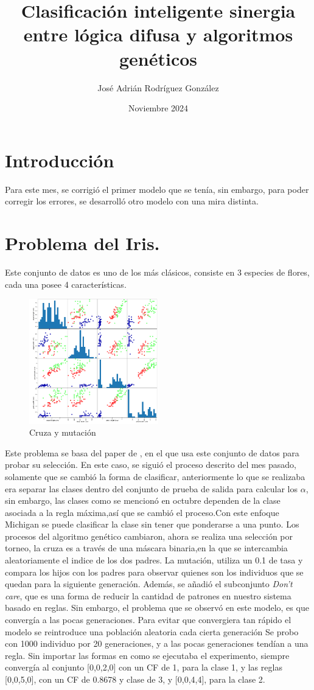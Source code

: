 \documentclass{article}
\title{Clasificación inteligente sinergia entre lógica difusa y algoritmos genéticos }
\author{José Adrián Rodríguez González}
\date{Noviembre 2024}
\begin{document}
\maketitle
\section{Introducción}
Para este mes, se corrigió el primer modelo que se tenía, sin embargo, para poder corregir los errores, se desarrolló otro modelo con una mira distinta.
\section{Problema del Iris.}
Este conjunto de datos es uno de los más clásicos, consiste en 3 especies de flores, cada una posee 4 características.
\begin{figure}[h]
    \centering
    \includegraphics[width=0.5\textwidth]{image.png}
    \caption{Cruza y mutación}
    \label{fig:fig1}
\end{figure}

Este problema se basa del paper de \citep{413232}, en el que usa este conjunto de datos para probar su selección. En este caso, se siguió el proceso descrito del mes pasado, solamente que se cambió la forma de clasificar, anteriormente lo que se realizaba era separar las clases dentro del conjunto de prueba de salida para calcular los \(\alpha\), sin embargo, las clases como se mencionó en octubre dependen de la clase asociada a la regla máxima,así que se cambió el proceso.Con este enfoque Michigan se puede clasificar la clase sin tener que ponderarse a una punto. Los procesos del algoritmo genético cambiaron, ahora se realiza una selección por torneo, la cruza es a través de una máscara binaria,en la que se intercambia aleatoriamente el indice de los dos padres.
La mutación, utiliza un 0.1 de tasa y compara los hijos con los padres para observar quienes son los individuos que se quedan para la siguiente generación. Además, se añadió el subconjunto \textit{Don't care}, que es una forma de reducir la cantidad de patrones en nuestro sistema basado en reglas.
Sin embargo, el problema que se observó en este modelo, es que convergía a las pocas generaciones.
Para evitar que convergiera tan rápido el modelo se reintroduce una población aleatoria cada cierta generación
Se probo con 1000 individuo por 20 generaciones, y a las pocas generaciones tendían a una regla. Sin importar las formas en como se ejecutaba el experimento, siempre convergía al conjunto [0,0,2,0] con un CF de 1, para la clase 1, y las reglas [0,0,5,0], con un CF de 0.8678 y clase de 3, y [0,0,4,4], para la clase 2.
\end{document}
